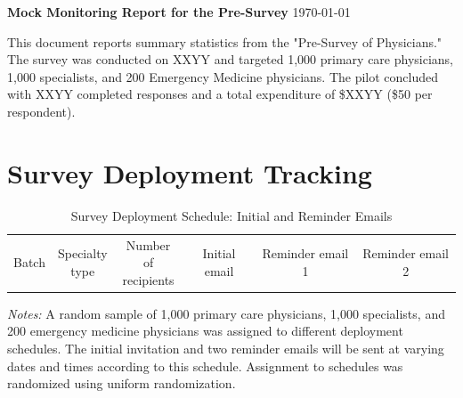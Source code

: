 \documentclass[11pt]{article}
\theoremstyle{definition}
\begin{document}
\singlespacing

\noindent

\begin{center}
\LARGE{\textbf{Mock Monitoring Report for the Pre-Survey}}
\break
\break
\today
\normalsize
\end{center}
\vspace{.8cm}

\vspace{.5cm}

\tableofcontents
\clearpage

This document reports summary statistics from the "Pre-Survey of Physicians." The survey was conducted on XXYY and targeted 1,000 primary care physicians, 1,000 specialists, and 200 Emergency Medicine physicians. The pilot concluded with XXYY completed responses and a total expenditure of \$XXYY  (\$50 per respondent). 

\clearpage

\section{Survey Deployment Tracking}

\begin{table}[H]
    \centering
    \caption{Survey Deployment Schedule: Initial and Reminder Emails}
    \begin{adjustbox}{width=1\linewidth} 
    \begin{tabular}{lccccccccccc} \toprule {Batch}&\shortstack{Specialty \\ type}&\shortstack{Number of \\ recipients}& \multicolumn{3}{c}{Initial email} & \multicolumn{3}{c}{Reminder email 1} & \multicolumn{3}{c}{Reminder email 2}  \\  \cmidrule(lr){4-6} \cmidrule(lr){7-9} \cmidrule(lr){10-12}  
    
    \end{tabular}
    \end{adjustbox}
    \label{tab:email_delivery}
          {\parbox{1\linewidth}{           %
		\scriptsize{{{ \textit{Notes:} A random sample of 1,000 primary care physicians, 1,000 specialists, and 200 emergency medicine physicians was assigned to different deployment schedules. The initial invitation and two reminder emails will be sent at varying dates and times according to this schedule. Assignment to schedules was randomized using uniform randomization.}}}}}
\end{table}
\end{document}
